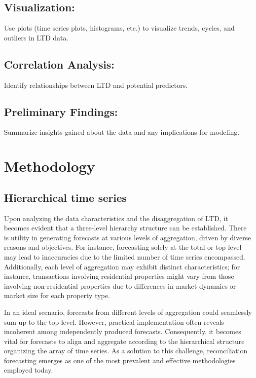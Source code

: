 \documentclass[11pt,a4paper,]{article}
\begin{document}
\subsection{Visualization:}\label{visualization}

Use plots (time series plots, histograms, etc.) to visualize trends, cycles, and outliers in LTD data.

\subsection{Correlation Analysis:}\label{correlation-analysis}

Identify relationships between LTD and potential predictors.

\subsection{Preliminary Findings:}\label{preliminary-findings}

Summarize insights gained about the data and any implications for modeling.

\section{Methodology}\label{methodology}

\subsection{Hierarchical time series}\label{hierarchical-time-series}

Upon analyzing the data characteristics and the disaggregation of LTD, it becomes evident that a three-level hierarchy structure can be established. There is utility in generating forecasts at various levels of aggregation, driven by diverse reasons and objectives. For instance, forecasting solely at the total or top level may lead to inaccuracies due to the limited number of time series encompassed. Additionally, each level of aggregation may exhibit distinct characteristics; for instance, transactions involving residential properties might vary from those involving non-residential properties due to differences in market dynamics or market size for each property type.

In an ideal scenario, forecasts from different levels of aggregation could seamlessly sum up to the top level. However, practical implementation often reveals incoherent among independently produced forecasts. Consequently, it becomes vital for forecasts to align and aggregate according to the hierarchical structure organizing the array of time series. As a solution to this challenge, reconciliation forecasting emerges as one of the most prevalent and effective methodologies employed today.
\end{document}
